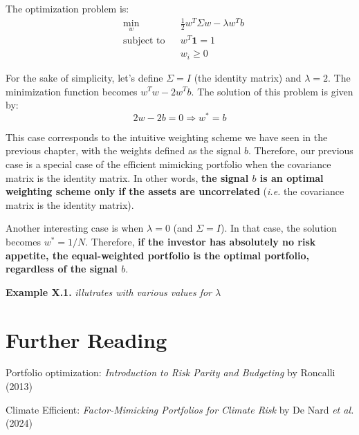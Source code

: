 The optimization problem is:
\begin{equation}
    \begin{aligned}
        & \underset{w}{\min}
        & &  \frac{1}{2} w^T \Sigma w - \lambda w^T b \\
        & \text{subject to}
        & & w^T \mathbf{1} = 1 \\
        & & & w_i \geq 0
    \end{aligned}
\end{equation}

For the sake of simplicity, let's define $\Sigma = I$ (the identity matrix)
and $\lambda = 2$.
The minimization function becomes $w^T w - 2 w^T b$. The solution of this problem is given by:
\begin{equation}
    2w - 2b = 0 \Rightarrow w^* = b
\end{equation}

This case corresponds to the intuitive weighting scheme 
we have seen in the previous chapter, with the weights defined 
as the signal $b$. Therefore, our previous case 
is a special case of the efficient mimicking portfolio 
when the covariance matrix is the identity matrix. 
In other words, \textbf{the signal $b$
is an optimal weighting scheme only if the assets are
uncorrelated} (\textit{i.e.} the covariance matrix is the identity matrix).

Another interesting case is when $\lambda = 0$ (and $\Sigma = I$).
In that case, the solution becomes $w^* = 1/N$. Therefore, \textbf{if 
the investor has absolutely no risk appetite, 
the equal-weighted portfolio is the optimal portfolio, 
regardless of the signal $b$}.


\begin{examplebox}
    \textbf{Example X.1.}    
    \textit{illutrates with various values for 
    $\lambda$}
\end{examplebox}

\section{Further Reading}

Portfolio optimization:
\textit{Introduction to Risk Parity and Budgeting} 
by Roncalli (2013) \cite{roncalli2013introduction}

Climate Efficient: \textit{Factor-Mimicking Portfolios for Climate Risk}
by De Nard \textit{et al.} (2024) \cite{de2024factor}
